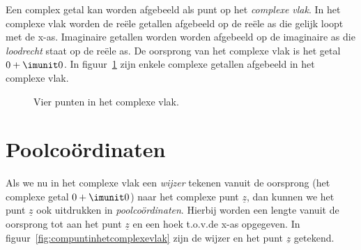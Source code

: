 %
%
%

Een complex getal kan worden afgebeeld als punt op het \textsl{complexe vlak}. In het complexe vlak worden de reële getallen afgebeeld op de reële as die gelijk loopt met de x-as. Imaginaire getallen worden worden afgebeeld op de imaginaire as die \textsl{loodrecht} staat op de reële as. De oorsprong van het complexe vlak is het getal $0+\imunit0$. In figuur~\ref{fig:comvierpunten} zijn enkele complexe getallen afgebeeld in het complexe vlak.

\begin{figure}[H]
\centering
{}
\caption{Vier punten in het complexe vlak.}
\label{fig:comvierpunten}
\end{figure}


\section{Poolcoördinaten}

Als we nu in het complexe vlak een \textsl{wijzer} tekenen vanuit de oorsprong (het complexe getal $0+\imunit0$) naar het complexe punt $\underline{z}$, dan kunnen we het punt $\underline{z}$ ook uitdrukken in \textsl{poolcoördinaten}. Hierbij worden een lengte vanuit de oorsprong tot aan het punt $\underline{z}$ en een hoek t.o.v.\@ de x-as opgegeven. In figuur~\ref{fig:compuntinhetcomplexevlak} zijn de wijzer en het punt $\underline{z}$ getekend.

